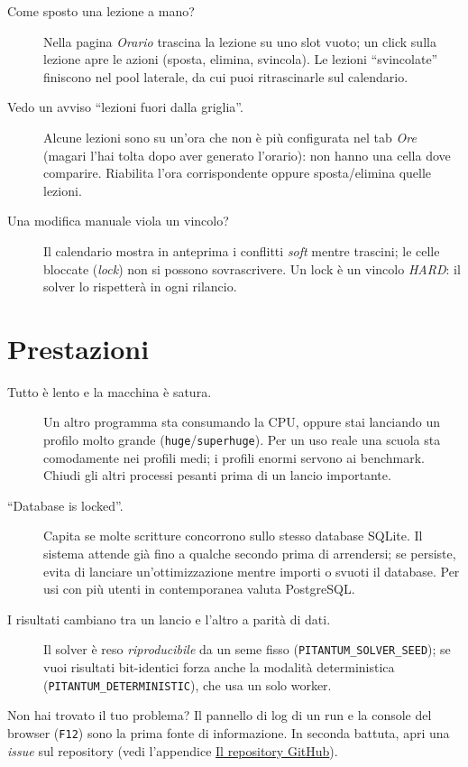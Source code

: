 \begin{description}

\item[Come sposto una lezione a mano?]
Nella pagina \emph{Orario} trascina la lezione su uno slot vuoto;
un click sulla lezione apre le azioni (sposta, elimina, svincola).
Le lezioni ``svincolate'' finiscono nel pool laterale, da cui puoi
ritrascinarle sul calendario.

\item[Vedo un avviso ``lezioni fuori dalla griglia''.]
Alcune lezioni sono su un'ora che non \`e pi\`u configurata nel
tab \emph{Ore} (magari l'hai tolta dopo aver generato l'orario):
non hanno una cella dove comparire. Riabilita l'ora corrispondente
oppure sposta/elimina quelle lezioni.

\item[Una modifica manuale viola un vincolo?]
Il calendario mostra in anteprima i conflitti \emph{soft} mentre
trascini; le celle bloccate (\emph{lock}) non si possono
sovrascrivere. Un lock \`e un vincolo \emph{HARD}: il solver lo
rispetter\`a in ogni rilancio.

\end{description}

\section{Prestazioni}

\begin{description}

\item[Tutto \`e lento e la macchina \`e satura.]
Un altro programma sta consumando la CPU, oppure stai lanciando
un profilo molto grande (\texttt{huge}/\texttt{superhuge}). Per un
uso reale una scuola sta comodamente nei profili medi; i profili
enormi servono ai benchmark. Chiudi gli altri processi pesanti
prima di un lancio importante.

\item[``Database is locked''.]
Capita se molte scritture concorrono sullo stesso database SQLite.
Il sistema attende gi\`a fino a qualche secondo prima di
arrendersi; se persiste, evita di lanciare un'ottimizzazione
mentre importi o svuoti il database. Per usi con pi\`u utenti in
contemporanea valuta PostgreSQL.

\item[I risultati cambiano tra un lancio e l'altro a parit\`a di dati.]
Il solver \`e reso \emph{riproducibile} da un seme fisso
(\texttt{PITANTUM\_SOLVER\_SEED}); se vuoi risultati
bit-identici forza anche la modalit\`a deterministica
(\texttt{PITANTUM\_DETERMINISTIC}), che usa un solo worker.

\end{description}

\begin{biblioparvabox}
Non hai trovato il tuo problema? Il pannello di log di un run e la
console del browser (\texttt{F12}) sono la prima fonte di
informazione. In seconda battuta, apri una \emph{issue} sul
repository (vedi l'appendice \hyperref[ch:repository_github]{Il
repository GitHub}).
\end{biblioparvabox}
